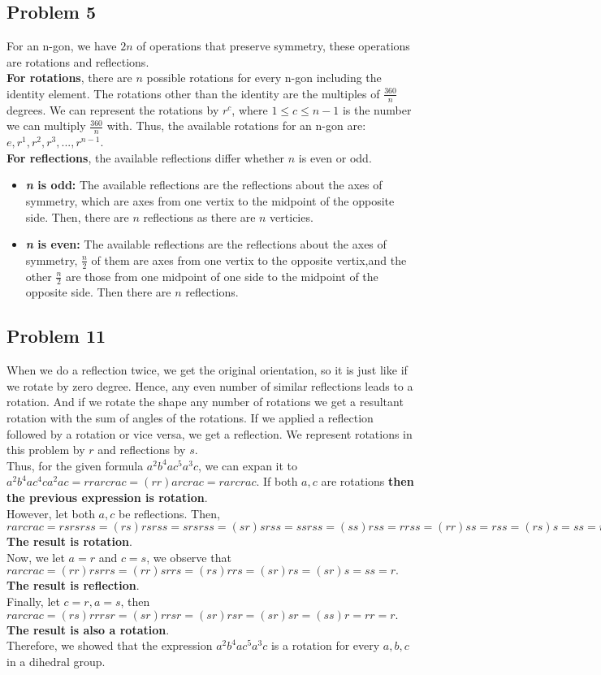 \documentclass[a4paper,12pt]{article}
\begin{document}
\subsection*{Problem 5}
For an n-gon, we have $2n$ of operations that preserve symmetry, these operations are rotations and reflections.\\
\textbf{For rotations}, there are $n$ possible rotations for every n-gon including the identity element. The rotations other than the identity are the multiples of $\frac{360}{n}$ degrees. We can represent the rotations by $r^c$, where $1\le c\le n-1$ is the number we can multiply $\frac{360}{n}$ with. Thus, the available rotations for an n-gon are: $e,r^1, r^2, r^3,...,r^{n-1}$.\\
\textbf{For reflections}, the available reflections differ whether $n$ is even or odd.
\begin{itemize}
    \item []\textbf{\textit{n} is odd:}
    The available reflections are the reflections about the axes of symmetry, which are axes from one vertix to the midpoint of the opposite side. Then, there are $n$ reflections as there are $n$ verticies.
    \item []\textbf{\textit{n} is even:}
    The available reflections are the reflections about the axes of symmetry, $\frac{n}{2}$ of them are axes from one vertix to the opposite vertix,and the other $\frac{n}{2}$ are those from one midpoint of one side to the midpoint of the opposite side. Then there are $n$ reflections.
\end{itemize}
\subsection*{Problem 11}
When we do a reflection twice, we get the original orientation, so it is just like if we rotate by zero degree. Hence, any even number of similar reflections leads to a rotation. And if we rotate the shape any number of rotations we get a resultant rotation with the sum of angles of the rotations. If we applied a reflection followed by a rotation or vice versa, we get a reflection.
We represent rotations in this problem by $r$ and reflections by $s$.\\ Thus, for the given formula $a^2b^4ac^5a^3c$, we can expan it to $a^2b^4ac^4ca^2ac=rrarcrac=(rr)arcrac=rarcrac.$ If both $a,c$ are rotations \textbf{then the previous expression is rotation}.\\ However, let both $a,c$ be reflections. Then, $rarcrac=rsrsrss=(rs)rsrss=srsrss=(sr)srss=ssrss=(ss)rss=rrss=(rr)ss=rss=(rs)s=ss=r.$ \textbf{The result is rotation}.\\ Now, we let $a=r$ and $c=s$, we observe that $rarcrac=(rr)rsrrs=(rr)srrs=(rs)rrs=(sr)rs=(sr)s=ss=r.$ \textbf{The result is reflection}.\\ Finally, let $c=r,a=s$, then $rarcrac=(rs)rrrsr=(sr)rrsr=(sr)rsr=(sr)sr=(ss)r=rr=r.$ \textbf{The result is also a rotation}.\\ Therefore, we showed that the expression $a^2b^4ac^5a^3c$ is a rotation for every $a,b,c$ in a dihedral group.
\end{document}
